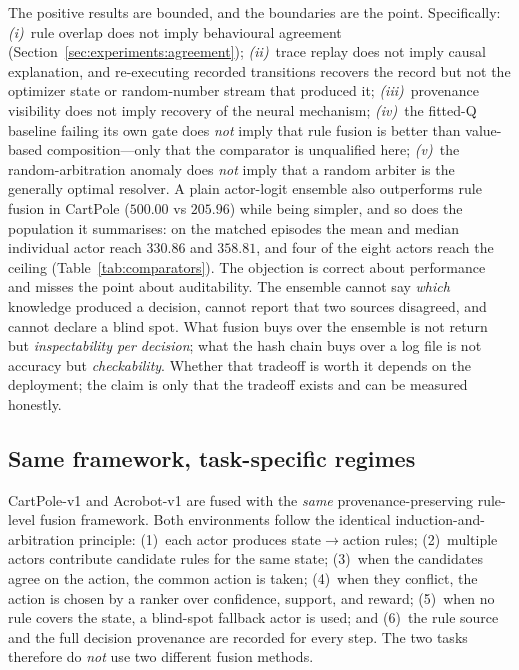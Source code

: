 \documentclass[11pt]{article}
\begin{document}
The positive results are bounded, and the boundaries are the point. Specifically:
\emph{(i)}~rule overlap does not imply behavioural agreement (Section~\ref{sec:experiments:agreement});
\emph{(ii)}~trace replay does not imply causal explanation, and re-executing recorded transitions
recovers the record but not the optimizer state or random-number stream that produced it;
\emph{(iii)}~provenance visibility does not imply recovery of the neural mechanism;
\emph{(iv)}~the fitted-Q baseline failing its own gate does \emph{not} imply that rule fusion is better
than value-based composition---only that the comparator is unqualified here;
\emph{(v)}~the random-arbitration anomaly does \emph{not} imply that a random arbiter is the generally
optimal resolver. A plain actor-logit ensemble also outperforms rule fusion in CartPole ($500.00$ vs
$205.96$) while being simpler, and so does the population it summarises: on the matched episodes the
mean and median individual actor reach $330.86$ and $358.81$, and four of the eight actors reach the
ceiling (Table~\ref{tab:comparators}). The objection is correct about performance and misses the point
about
auditability. The ensemble cannot say \emph{which} knowledge produced a decision, cannot report that two
sources disagreed, and cannot declare a blind spot. What fusion buys over the ensemble is not return but
\emph{inspectability per decision}; what the hash chain buys over a log file is not accuracy but
\emph{checkability}. Whether that tradeoff is worth it depends on the deployment; the claim is only that
the tradeoff exists and can be measured honestly.

\subsection{Same framework, task-specific regimes}
\label{sec:discussion:regimes}

CartPole-v1 and Acrobot-v1 are fused with the \emph{same} provenance-preserving rule-level
fusion framework. Both environments follow the identical induction-and-arbitration principle:
(1)~each actor produces state$\to$action rules; (2)~multiple actors contribute candidate rules
for the same state; (3)~when the candidates agree on the action, the common action is taken;
(4)~when they conflict, the action is chosen by a ranker over confidence, support, and reward;
(5)~when no rule covers the state, a blind-spot fallback actor is used; and (6)~the rule source
and the full decision provenance are recorded for every step. The two tasks therefore do
\emph{not} use two different fusion methods.
\end{document}
